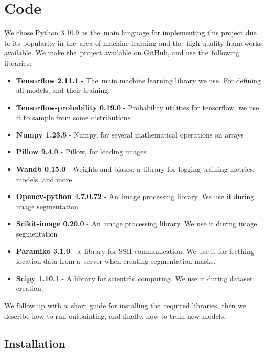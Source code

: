 \chapter{Code} \label{code}

We chose Python 3.10.9 as the~main language for implementing this project due to its popularity in the~area of machine learning and the~high quality frameworks available. We make the~project available on \textcolor{red}{\href{https://github.com/Matezzzz/Image_outpainting}{GitHub}}, and use the~following libraries:

\begin{itemize}
    \item \textbf{Tensorflow 2.11.1} \citep{tensorflow} - The~main machine learning library we use. For defining all models, and their training.
    \item \textbf{Tensorflow-probability 0.19.0} \citep{tensorflow_probability} - Probability utilities for tensorflow, we use it to sample from some distributions
    \item \textbf{Numpy 1.23.5} \citep{numpy} - Numpy, for several mathematical operations on arrays
    \item \textbf{Pillow 9.4.0} \citep{pillow} - Pillow, for loading images
    \item \textbf{Wandb 0.15.0} \citep{wandb} - Weights and biases, a~library for logging training metrics, models, and more.
    \item \textbf{Opencv-python 4.7.0.72} \citep{opencv_python} - An~image processing library. We use it during image segmentation
    \item \textbf{Scikit-image 0.20.0} \citep{scikit_image} - An~image processing library. We use it during image segmentation
    \item \textbf{Paramiko 3.1.0} \citep{paramiko} - a~library for SSH communication. We use it for fecthing location data from a~server when creating segmentation masks.
    \item \textbf{Scipy 1.10.1} \citep{scipy} - A library for scientific computing. We use it during dataset creation.
\end{itemize}


We follow up with a~short guide for installing the~required libraries, then we describe how to run outpainting, and finally, how to train new models.

\section{Installation}

